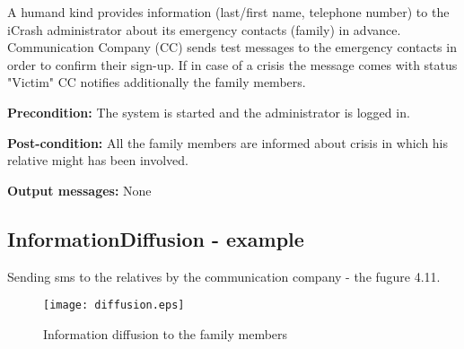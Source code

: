 A humand kind provides information (last/first name, telephone number) to the
iCrash administrator about its emergency contacts (family) in advance.
Communication Company (CC) sends test messages to the emergency contacts in
order to confirm their sign-up.
If in case of a crisis the message comes with status "Victim" CC notifies
additionally the family members.

\begin{description}
	\item \textbf{Precondition:} The system is started and the administrator is
	logged in.
	\item \textbf{Post-condition:} All the family members are informed about crisis
	in which his relative might has been involved.
	\item \textbf{Output messages:} None
	
\end{description}


\subsection{InformationDiffusion - example}
Sending sms to the relatives by the communication company - the fugure 4.11.
\begin{figure}[h]
    \texttt{[image: diffusion.eps]}
	\caption{Information diffusion to the family members}
\end{figure}

